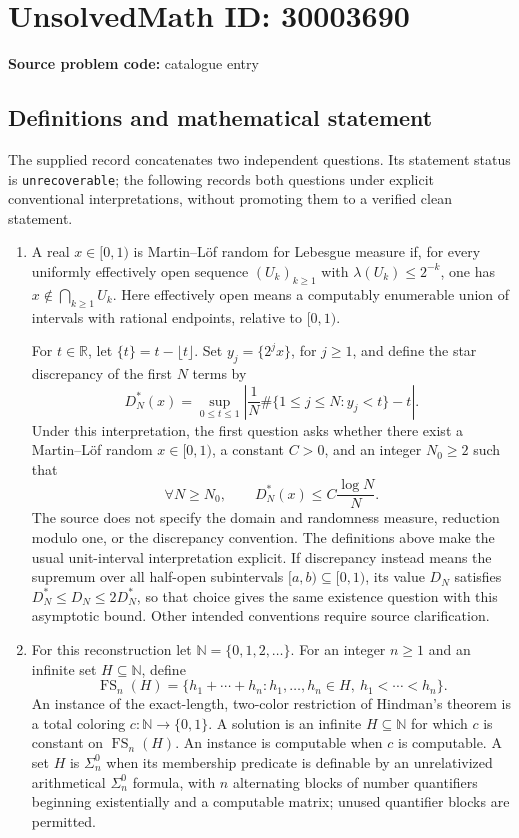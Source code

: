 \documentclass[11pt]{article}
\newcommand{\N}{\mathbb{N}}
\newcommand{\R}{\mathbb{R}}
\begin{document}
\section*{UnsolvedMath ID: 30003690}
\textbf{Source problem code:} catalogue entry
\subsection{Definitions and mathematical statement}
The supplied record concatenates two independent questions. Its statement status is \texttt{unrecoverable}; the following records both questions under explicit conventional interpretations, without promoting them to a verified clean statement.

\begin{enumerate}
\item A real \(x\in[0,1)\) is Martin--L\"of random for Lebesgue measure if, for every uniformly effectively open sequence \((U_k)_{k\geq1}\) with \(\lambda(U_k)\leq 2^{-k}\), one has \(x\notin\bigcap_{k\geq1}U_k\). Here effectively open means a computably enumerable union of intervals with rational endpoints, relative to \([0,1)\).

For \(t\in\R\), let \(\{t\}=t-\lfloor t\rfloor\). Set \(y_j=\{2^j x\}\), for \(j\geq1\), and define the star discrepancy of the first \(N\) terms by
\[
D_N^*(x)=\sup_{0\leq t\leq1}\left|\frac{1}{N}\#\{1\leq j\leq N:y_j<t\}-t\right|.
\]
Under this interpretation, the first question asks whether there exist a Martin--L\"of random \(x\in[0,1)\), a constant \(C>0\), and an integer \(N_0\geq2\) such that
\[
\forall N\geq N_0,\qquad D_N^*(x)\leq C\frac{\log N}{N}.
\]
The source does not specify the domain and randomness measure, reduction modulo one, or the discrepancy convention. The definitions above make the usual unit-interval interpretation explicit. If discrepancy instead means the supremum over all half-open subintervals \([a,b)\subseteq[0,1)\), its value \(D_N\) satisfies \(D_N^*\leq D_N\leq2D_N^*\), so that choice gives the same existence question with this asymptotic bound. Other intended conventions require source clarification.

\item For this reconstruction let \(\N=\{0,1,2,\ldots\}\). For an integer \(n\geq1\) and an infinite set \(H\subseteq\N\), define
\[
\operatorname{FS}_n(H)=\{h_1+\cdots+h_n:h_1,\ldots,h_n\in H,\ h_1<\cdots<h_n\}.
\]
An instance of the exact-length, two-color restriction of Hindman's theorem is a total coloring \(c:\N\to\{0,1\}\). A solution is an infinite \(H\subseteq\N\) for which \(c\) is constant on \(\operatorname{FS}_n(H)\). An instance is computable when \(c\) is computable. A set \(H\) is \(\Sigma^0_n\) when its membership predicate is definable by an unrelativized arithmetical \(\Sigma^0_n\) formula, with \(n\) alternating blocks of number quantifiers beginning existentially and a computable matrix; unused quantifier blocks are permitted.


\end{enumerate}
\end{document}
